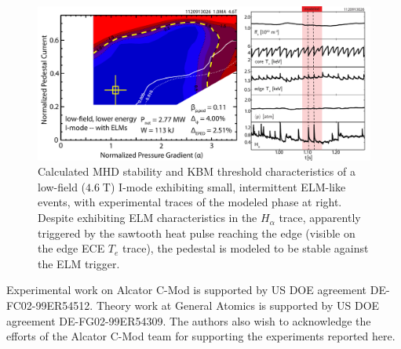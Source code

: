 \documentclass[12pt,floatfix,showpacs]{revtex4-1}
\begin{document}
\begin{figure}[ht]
 \includegraphics[width=\textwidth]{pdfgraphics/1120913026_ELITE_stitch_v3.pdf}
 \caption{Calculated MHD stability and KBM threshold characteristics of a low-field ($4.6\;\mbox{T}$) I-mode exhibiting small, intermittent ELM-like events, with experimental traces of the modeled phase at right.  Despite exhibiting ELM characteristics in the $H_\alpha$ trace, apparently triggered by the sawtooth heat pulse reaching the edge (visible on the edge ECE $T_e$ trace), the pedestal is modeled to be stable against the ELM trigger.}
 \label{fig:elite_1120913026}
\end{figure}


\begin{acknowledgments}
 Experimental work on Alcator C-Mod is supported by US DOE agreement DE-FC02-99ER54512. Theory work at General Atomics is supported by US DOE agreement DE-FG02-99ER54309.  The authors also wish to acknowledge the efforts of the Alcator C-Mod team for supporting the experiments reported here.
\end{acknowledgments}



\end{document}
